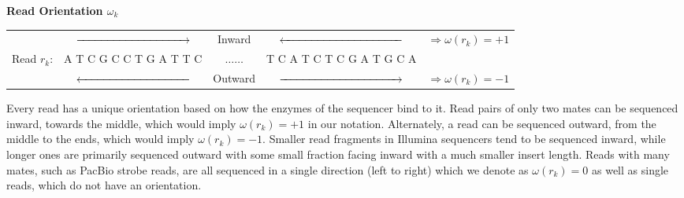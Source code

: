 \documentclass[phd,tocprelim]{cornell}
\begin{document}
\begin{center}
\textbf{Read Orientation $\omega_{k}$} \\
\begin{tabular}{ccccc} \\
 & $\xrightarrow{\hspace*{3.4cm}}$ & Inward & $\xleftarrow{\hspace*{3.7cm}}$ & $\Rightarrow \omega(r_{k}) = +1$ \\
 Read $r_{k}$: & {\color{red} A}{\color{blue} T}{\color{MyDarkGreen} C}{\color{orange} G}{\color{MyDarkGreen} C}{\color{MyDarkGreen} C}{\color{blue} T}{\color{orange} G}{\color{red} A}{\color{blue} T}{\color{blue} T}{\color{MyDarkGreen} C} & $\hdots\hdots$ & {\color{blue} T}{\color{MyDarkGreen} C}{\color{red} A}{\color{blue} T}{\color{MyDarkGreen} C}{\color{blue} T}{\color{MyDarkGreen} C}{\color{orange} G}{\color{red} A}{\color{blue} T}{\color{orange} G}{\color{MyDarkGreen} C}{\color{red} A} & \\
 & $\xleftarrow{\hspace*{3.4cm}}$ & Outward & $\xrightarrow{\hspace*{3.7cm}}$ & $\Rightarrow \omega(r_{k}) = -1$
\end{tabular}
\end{center}
Every read has a unique orientation based on how the enzymes of the sequencer bind to it. Read pairs of only two mates can be sequenced inward, towards the middle, which would imply $\omega(r_{k}) = +1$ in our notation. Alternately, a read can be sequenced outward, from the middle to the ends, which would imply $\omega(r_{k}) = -1$. Smaller read fragments in Illumina sequencers tend to be sequenced inward, while longer ones are primarily sequenced outward with some small fraction facing inward with a much smaller insert length. Reads with many mates, such as PacBio strobe reads, are all sequenced in a single direction (left to right) which we denote as $\omega(r_{k}) = 0$ as well as single reads, which do not have an orientation.
\end{document}
